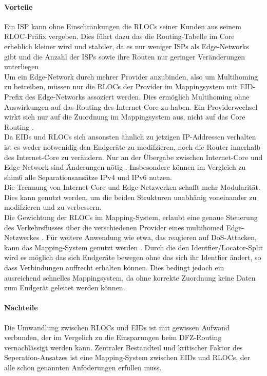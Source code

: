 \paragraph{Vorteile}
Ein ISP kann ohne Einschränkungen die RLOCs seiner Kunden aus seinem RLOC-Präfix vergeben. Dies führt dazu das die Routing-Tabelle im Core erheblich kleiner wird und stabiler, da es nur weniger ISPs als Edge-Networks gibt und die Anzahl der ISPs sowie ihre Routen nur geringer Veränderungen unterliegen \cite{jen:2008:start} \cite{deering:1996:map} \\
Um ein Edge-Network durch mehrer Provider anzubinden, also um Multihoming zu betreiben, müssen nur die RLOCs der Provider im Mappingsystem mit EID-Prefix des Edge-Networks assoziert werden. Dies ermöglich Multihoming ohne Auswirkungen auf das Routing des Internet-Core zu haben. Ein Providerwechsel wirkt sich nur auf die Zuordnung im  Mappingsystem aus, nicht auf das Core Routing \cite{farinacci:2009:LISP}.\\
Da EIDs und RLOCs sich ansonsten ähnlich zu jetzigen IP-Addressen verhalten ist es weder notwenidig den Endgeräte zu modifzieren, noch die Router innerhalb des Internet-Core zu verändern. Nur an der Übergabe zwischen Internet-Core und Edge-Network sind Änderungen nötig \cite{jen:2008:start}. Insbesondere können im Vergleich zu shim6 alle Separationsansätze IPv4 und IPv6 nutzen.\\
Die Trennung von Internet-Core und Edge Netzwerken schafft mehr Modularität. Dies kann genutzt werden, um die beiden Strukturen unabhänig voneinander zu modifzieren und zu verbessern. \\
Die Gewichtung der RLOCs im Mapping-System, erlaubt eine genaue Steuerung des Verkehrsflusses über die verschiedenen Provider eines multihomed Edge-Netzwerkes \cite{mathy:2008:dht}. Für weitere Anwendung wie etwa, das reagieren auf DoS-Attacken, kann das Mapping-System genutzt werden \cite{jen:2008:start}.
Durch die den Identfier/Locator-Split wird es möglich das sich Endgeräte bewegen ohne das sich ihr Identfier ändert, so dass Verbindungen auffrecht erhalten können. Dies bedingt jedoch ein ausreichend schnelles Mappingsystem, da ohne korrekte Zuordnung keine Daten zum Endgerät geleitet werden können. \\


\paragraph{Nachteile}
Die Umwandlung zwischen RLOCs und EIDs ist mit gewissen Aufwand verbunden, der im Vergelich zu die Einsparungen beim DFZ-Routing vernachlässigt werden kann. Zentraler Bestandteil und kritischer Faktor des Seperation-Ansatzes ist eine Mapping-System zwischen EIDs und RLOCs, der alle schon genannten Anfoderungen erfüllen muss. 


